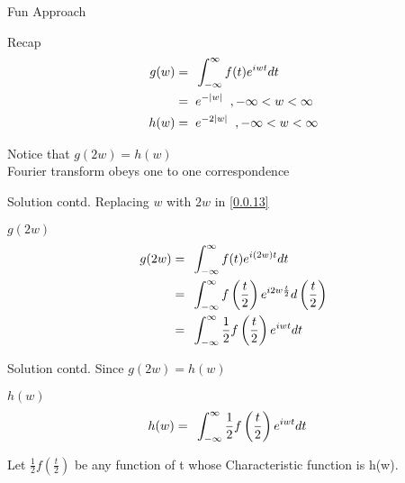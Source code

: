 \documentclass{beamer}
\providecommand{\brak}[1]{\ensuremath{\left(#1\right)}}
\providecommand{\abs}[1]{\vert#1\vert}
\begin{document}
\begin{frame}{Fun Approach}
  \begin{block}{Recap}
    \begin{align}
      g(w) = & \hspace{0.2cm}  \int_{-\infty}^{\infty}  f(t) {e}^{iwt} dt     \label{0.0.13} \\
      =      & \hspace{0.2cm}  e^{-\abs{w}}\hspace{0.2cm}, -\infty<w<\infty                  \\
      h(w) = & \hspace{0.2cm} {e}^{-2\abs{w}}\hspace{0.2cm}, -\infty<w<\infty
    \end{align}
  \end{block}
  Notice that $g(2w) = h(w)$\\
  Fourier transform obeys one to one correspondence
\end{frame}
\begin{frame}{Solution contd.}
  Replacing $w$ with $2w$ in \eqref{0.0.13}
  \begin{block}{$g(2w)$}
    \begin{align}
      g(2w) = & \hspace{0.2cm}  \int_{-\infty}^{\infty}  f(t) {e}^{i(2w)t} dt                                         \\
      =       & \hspace{0.2cm}  \int_{-\infty}^{\infty}  f\brak{\frac{t}{2}} {e}^{i2w\frac{t}{2}} d\brak{\frac{t}{2}} \\
      =       & \hspace{0.2cm}  \int_{-\infty}^{\infty}  \frac{1}{2} f\brak{\frac{t}{2}} {e}^{iwt} dt
    \end{align}
  \end{block}
\end{frame}
\begin{frame}{Solution contd.}
  Since $g(2w) = h(w)$
  \begin{block}{$h(w)$}
    \begin{align}
      h(w) = & \hspace{0.2cm}  \int_{-\infty}^{\infty}  \frac{1}{2} f\brak{\frac{t}{2}} {e}^{iwt} dt
    \end{align}
  \end{block}
  Let $\frac{1}{2} f\brak{\frac{t}{2}}$ be any function of t whose Characteristic function is h(w).
\end{frame}
\end{document}
